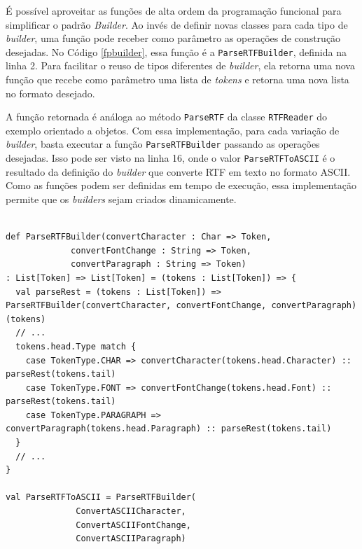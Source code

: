 É possível aproveitar as funções de alta ordem 
da programação funcional para simplificar o 
padrão \textit{Builder}. Ao invés de definir novas 
classes para cada tipo de \textit{builder}, uma função 
pode receber como 
parâmetro as operações de construção desejadas. 
No Código \ref{fpbuilder}, essa função é a 
\texttt{ParseRTFBuilder}, definida na linha 2. 
Para facilitar o reuso de tipos diferentes 
de \textit{builder}, ela retorna uma nova 
função que recebe como parâmetro uma 
lista de \textit{tokens} e 
retorna uma nova lista no formato desejado. 

A função retornada é análoga ao método 
\texttt{ParseRTF} da classe \texttt{RTFReader} do exemplo 
orientado a objetos. Com essa implementação, 
para cada variação de \textit{builder}, 
basta executar a função 
\texttt{ParseRTFBuilder} passando as operações 
desejadas. Isso pode ser visto na linha 16, 
onde o valor \texttt{ParseRTFToASCII} é o resultado 
da definição do \textit{builder} que converte 
RTF em texto no formato ASCII. Como as funções 
podem ser definidas em tempo de execução, essa 
implementação permite que os \textit{builders} 
sejam criados dinamicamente.

\begin{lstlisting}[caption={\textit{Builder} Funcional.},label=fpbuilder]
    
def ParseRTFBuilder(convertCharacter : Char => Token,
             convertFontChange : String => Token,
             convertParagraph : String => Token)
: List[Token] => List[Token] = (tokens : List[Token]) => {
  val parseRest = (tokens : List[Token]) => ParseRTFBuilder(convertCharacter, convertFontChange, convertParagraph)(tokens)
  // ...
  tokens.head.Type match {
    case TokenType.CHAR => convertCharacter(tokens.head.Character) :: parseRest(tokens.tail)
    case TokenType.FONT => convertFontChange(tokens.head.Font) :: parseRest(tokens.tail)
    case TokenType.PARAGRAPH => convertParagraph(tokens.head.Paragraph) :: parseRest(tokens.tail)
  }
  // ...
}

val ParseRTFToASCII = ParseRTFBuilder(
              ConvertASCIICharacter,
              ConvertASCIIFontChange,
              ConvertASCIIParagraph)
    
\end{lstlisting}
